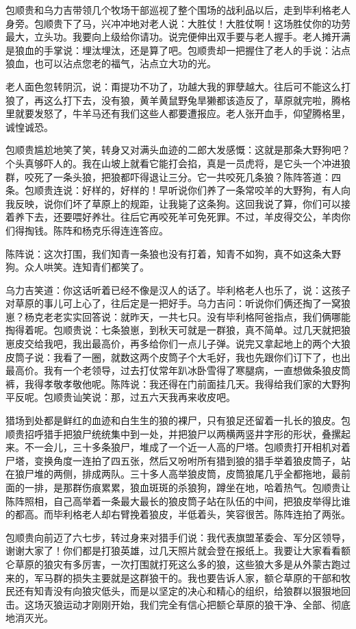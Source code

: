 \par 包顺贵和乌力吉带领几个牧场干部巡视了整个围场的战利品以后，走到毕利格老人身旁。包顺贵下了马，兴冲冲地对老人说：大胜仗！大胜仗啊！这场胜仗你的功劳最大，立头功。我要向上级给你请功。说完便伸出双手要与老人握手。老人摊开满是狼血的手掌说：埋汰埋汰，还是算了吧。包顺贵却一把握住了老人的手说：沾点狼血，也可以沾点您老的福气，沾点立大功的光。
\par 老人面色忽转阴沉，说：甭提功不功了，功越大我的罪孽越大。往后可不能这么打狼了，再这么打下去，没有狼，黄羊黄鼠野兔旱獭都该造反了，草原就完啦，腾格里就要发怒了，牛羊马还有我们这些人都要遭报应。老人张开血手，仰望腾格里，诚惶诚恐。
\par 包顺贵尴尬地笑了笑，转身又对满头血迹的二郎大发感慨：这就是那条大野狗吧？个头真够吓人的。我在山坡上就看它能打会掐，真是一员虎将，是它头一个冲进狼群，咬死了一条头狼，把狼都吓得退让三分。它一共咬死几条狼？陈阵答道：四条。包顺贵连说：好样的，好样的！早听说你们养了一条常咬羊的大野狗，有人向我反映，说你们坏了草原上的规距，让我毙了这条狗。这回我说了算，你们可以接着养下去，还要喂好养壮。往后它再咬死羊可免死罪。不过，羊皮得交公，羊肉你们得掏钱。陈阵和杨克乐得连连答应。
\par 陈阵说：这次打围，我们知青一条狼也没有打着，知青不如狗，真不如这条大野狗。众人哄笑。连知青们都笑了。
\par 乌力吉笑道：你这话听着已经不像是汉人的话了。毕利格老人也乐了，说：这孩子对草原的事儿可上心了，往后定是一把好手。乌力吉问：听说你们俩还掏了一窝狼崽？杨克老老实实回答说：就昨天，一共七只。没有毕利格阿爸指点，我们俩哪能掏得着呢。包顺贵说：七条狼崽，到秋天可就是一群狼，真不简单。过几天就把狼崽皮交给我吧，我出最高价，再多给你们一点儿子弹。说完又拿起地上的两个大狼皮筒子说：我看了一圈，就数这两个皮筒子个大毛好，我也先跟你们订下了，也出最高价。我有一个老领导，过去打仗常年趴冰卧雪得了寒腿病，一直想做条狼皮筒裤，我得孝敬孝敬他呢。陈阵说：我还得在门前面挂几天。我得给我们家的大野狗平反呢。包顺贵讪笑说：那，过五六天我再来收皮吧。
\par 猎场到处都是鲜红的血迹和白生生的狼的裸尸，只有狼足还留着一扎长的狼皮。包顺贵招呼猎手把狼尸统统集中到一处，并把狼尸以两横两竖井字形的形状，叠摞起来。不一会儿，三十多条狼尸，堆成了一个近一人高的尸塔。包顺贵打开相机对着尸塔，变换角度一连拍了四五张，然后又吩咐所有猎到狼的猎手举着狼皮筒子，站在狼尸堆的两侧，排成两队。三十多人高举狼皮筒，皮筒狼尾几乎全都拖地，最前面的一排，是那群伤痕累累，狼血斑斑的杀狼狗，蹲坐在地，哈着热气。包顺贵让陈阵照相，自己高举着一条最大最长的狼皮筒子站在队伍的中间，把狼皮举得比谁的都高。而毕利格老人却右臂挽着狼皮，半低着头，笑容很苦。陈阵连拍了两张。
\par 包顺贵向前迈了六七步，转过身来对猎手们说：我代表旗盟革委会、军分区领导，谢谢大家了！你们都是打狼英雄，过几天照片就会登在报纸上。我要让大家看看额仑草原的狼灾有多厉害，一次打围就打死这么多的狼，这些狼大多是从外蒙古跑过来的，军马群的损失主要就是这群狼干的。我也要告诉人家，额仑草原的干部和牧民还有知青没有向狼灾低头，而是以坚定的决心和精心的组织，给狼群以狠狠地回击。这场灭狼运动才刚刚开始，我们完全有信心把额仑草原的狼干净、全部、彻底地消灭光。
